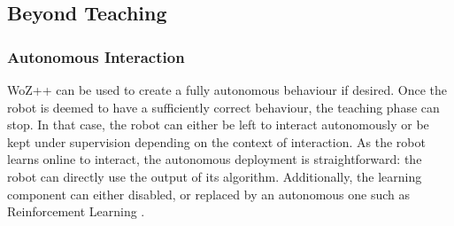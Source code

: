 \documentclass[manuscript, review, anonymous]{acmart}
\newcommand{\ES}[1]{\added[id=ES]{#1}}
\newcommand{\woz}{WoZ++\xspace}
\begin{document}
\subsection{Beyond Teaching}

\subsubsection{Autonomous Interaction}

\woz can be used to create a fully autonomous behaviour if desired.  Once the
robot is deemed to have a sufficiently correct behaviour, the teaching phase can stop.
In that case, the robot can either be left to interact autonomously or be
kept under supervision depending on the context of interaction.  
As the robot learns online to interact, the autonomous deployment is
straightforward: the robot can directly use the output of its algorithm.
Additionally, the learning component can either disabled, or replaced by an
autonomous one such as Reinforcement Learning \cite{sutton1998reinforcement}. 
\end{document}
